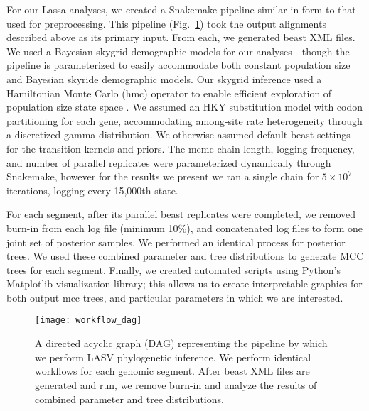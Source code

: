 For our Lassa analyses, we created a Snakemake pipeline similar in form to that used for preprocessing.
This pipeline (Fig.~\ref{fig:workflow_dag}) took the output alignments described above as its primary input.
From each, we generated \gls{beast} XML files.
We used a Bayesian skygrid demographic models for our analyses---though the pipeline is parameterized to easily accommodate both constant population size and Bayesian skyride \cite{minin2008smooth} demographic models.
Our skygrid inference used a Hamiltonian Monte Carlo (\gls{hmc}) operator to enable efficient exploration of population size state space \cite{baele2020hamiltonian}.
We assumed an HKY substitution model with codon partitioning for each gene, accommodating among-site rate heterogeneity through a discretized gamma distribution.
We otherwise assumed default \gls{beast} settings for the transition kernels and priors.
The \gls{mcmc} chain length, logging frequency, and number of parallel replicates were parameterized dynamically through Snakemake, however for the results we present we ran a single chain for $5\times10^7$ iterations, logging every 15,000th state.

For each segment, after its parallel \gls{beast} replicates were completed, we removed burn-in from each log file (minimum 10\%), and concatenated log files to form one joint set of posterior samples.
We performed an identical process for posterior trees. %
We used these combined parameter and tree distributions to generate MCC trees for each segment.
Finally, we created automated scripts using Python's Matplotlib \cite{hunter2007matplotlib} visualization library; this allows us to create interpretable graphics for both output \gls{mcc} trees, and particular parameters in which we are interested.

\begin{figure}[ht]
  \centering
  \medskip
  \texttt{[image: workflow\_dag]}
  \caption[LASV phylogenetics pipeline]{A directed acyclic graph (DAG) representing the pipeline by which we perform LASV phylogenetic inference. We perform identical workflows for each genomic segment. After \gls{beast} XML files are generated and run, we remove burn-in and analyze the results of combined parameter and tree distributions.}
  \label{fig:workflow_dag}
\end{figure}

